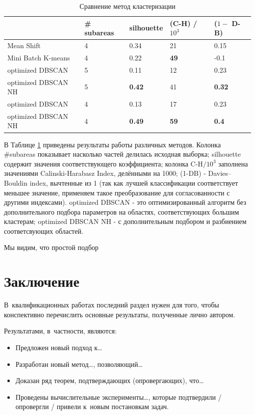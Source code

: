 \documentclass[12pt,fleqn]{article}
\begin{document}
\begin{table}[H]
\begin{center}
\begin{tabular}{|l|l|l|l|l|}
\hline
                    & \# subareas & silhouette & (C-H) / $10^3$ & ($1 -$ D-B) \\ \hline
Mean Shift          & 4           & 0.34       & 21       & 0.15      \\ \hline
Mini Batch K-means  & 4           & 0.22       & \textbf{49}       & -0.1      \\ \hline
optimized DBSCAN    & 5           & 0.11       & 12       & 0.23      \\
optimized DBSCAN NH & 5           & \textbf{0.42}       & 41       & \textbf{0.32}      \\ \hline
optimized DBSCAN    & 4           & 0.13       & 17       & 0.23      \\
optimized DBSCAN NH & 4           & \textbf{0.49}       & \textbf{59}       & \textbf{0.4}       \\ \hline
\end{tabular}
\caption{Сравнение метод кластеризации}\label{all_methods}
\end{center}
\end{table}
 
 В Таблице \ref{all_methods} приведены результаты работы различных методов. Колонка \#subareas показывает насколько частей делилась исходная выборка; silhouette содержит значения соответствующего коэффициента; колонка C-H$/10^3$ заполнена значениями Calinski-Harabasz Index, делёнными на 1000; (1-DB) - Davies–Bouldin index, вычтенные из 1 (так как лучшей классификации соответствует меньшее значение, применяем такое преобразование для согласованности с другими индексами). optimized DBSCAN - это оптимизированный алгоритм без дополнительного подбора параметров на областях, соответствующих большим кластерам; optimized DBSCAN NH - с дополнительным подбором и разбиением соответсвующих областей.
 
Мы видим, что простой подбор 




\section{Заключение}

В~квалификационных работах последний раздел нужен для того, чтобы
конспективно перечислить основные результаты, полученные лично автором.

Результатами, в~частности, являются:
\begin{itemize}
\item
    Предложен новый подход к\dots
\item
    Разработан новый метод\dots, позволяющий\dots
\item
    Доказан ряд теорем, подтверждающих (опровергающих), что\dots
\item
    Проведены вычислительные эксперименты\dots,
    которые подтвердили / опровергли / привели к~новым постановкам задач.
\end{itemize}
\end{document}
